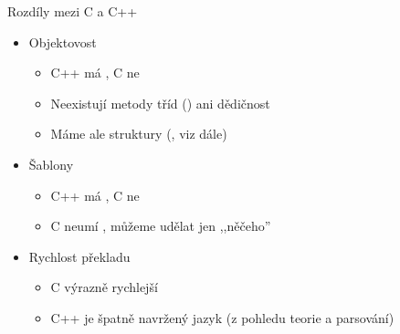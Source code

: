 \begin{frame}{Rozdíly mezi C a C++}

  \begin{itemize}
    \item Objektovost
    \begin{itemize}
      \item C++ má , C ne
      \item Neexistují metody tříd () ani dědičnost
      \item Máme ale struktury (, viz dále)
    \end{itemize}

    \pause

    \item Šablony
    \begin{itemize}
      \item C++ má , C ne
      \item C neumí , můžeme udělat jen 
	,,něčeho''
    \end{itemize}

    \pause

    \item Rychlost překladu
    \begin{itemize}
      \item C výrazně rychlejší
      \item C++ je špatně navržený jazyk (z pohledu teorie a parsování)
    \end{itemize}

  \end{itemize}

\end{frame}

